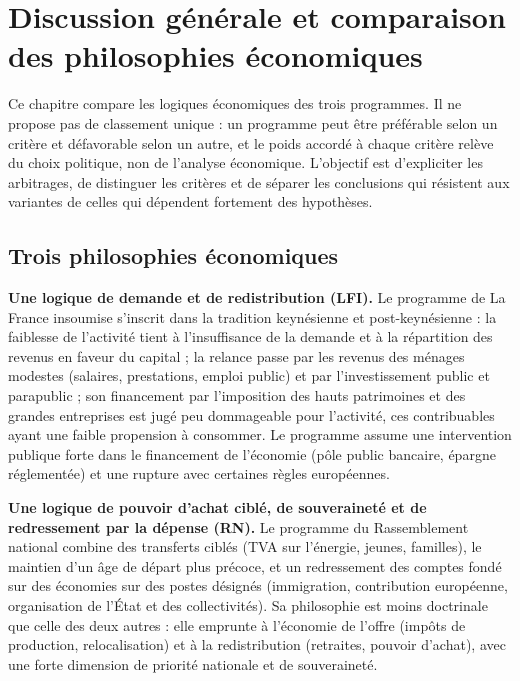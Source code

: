 \documentclass[
  11pt,
  11pt,
  a4paper,
  openany]{book}
\begin{document}
\hypertarget{sec:discussion}{%
\chapter{Discussion générale et comparaison des philosophies
économiques}\label{sec:discussion}}

Ce chapitre compare les logiques économiques des trois programmes. Il ne
propose pas de classement unique : un programme peut être préférable
selon un critère et défavorable selon un autre, et le poids accordé à
chaque critère relève du choix politique, non de l'analyse économique.
L'objectif est d'expliciter les arbitrages, de distinguer les critères
et de séparer les conclusions qui résistent aux variantes de celles qui
dépendent fortement des hypothèses.

\hypertarget{sec:philosophies}{%
\section{Trois philosophies économiques}\label{sec:philosophies}}

\textbf{Une logique de demande et de redistribution (LFI).} Le programme
de La France insoumise s'inscrit dans la tradition keynésienne et
post-keynésienne : la faiblesse de l'activité tient à l'insuffisance de
la demande et à la répartition des revenus en faveur du capital ; la
relance passe par les revenus des ménages modestes (salaires,
prestations, emploi public) et par l'investissement public et parapublic
; son financement par l'imposition des hauts patrimoines et des grandes
entreprises est jugé peu dommageable pour l'activité, ces contribuables
ayant une faible propension à consommer. Le programme assume une
intervention publique forte dans le financement de l'économie (pôle
public bancaire, épargne réglementée) et une rupture avec certaines
règles européennes.

\textbf{Une logique de pouvoir d'achat ciblé, de souveraineté et de
redressement par la dépense (RN).} Le programme du Rassemblement
national combine des transferts ciblés (TVA sur l'énergie, jeunes,
familles), le maintien d'un âge de départ plus précoce, et un
redressement des comptes fondé sur des économies sur des postes désignés
(immigration, contribution européenne, organisation de l'État et des
collectivités). Sa philosophie est moins doctrinale que celle des deux
autres : elle emprunte à l'économie de l'offre (impôts de production,
relocalisation) et à la redistribution (retraites, pouvoir d'achat),
avec une forte dimension de priorité nationale et de souveraineté.
\end{document}
